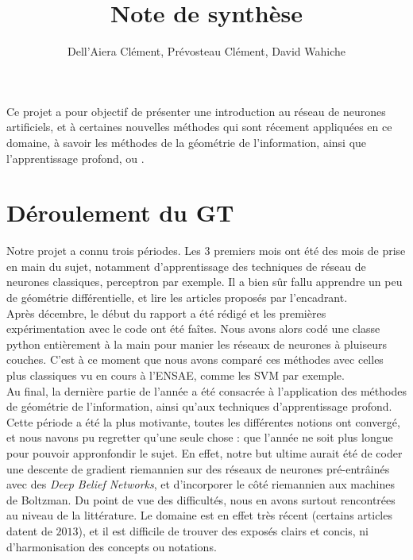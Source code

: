 \documentclass{article}
\title{Note de synthèse}
\author{Dell'Aiera Clément, Prévosteau Clément, David Wahiche}
\date{}
\begin{document}
\maketitle


Ce projet a pour objectif de présenter une introduction au réseau de neurones artificiels, et à certaines nouvelles méthodes qui sont récement appliquées en ce domaine, à savoir les méthodes de la géométrie de l'information, ainsi que l'apprentissage profond, ou .\\

\section{Déroulement du GT}

Notre projet a connu trois périodes. Les 3 premiers mois ont été des mois de prise en main du sujet, notamment d'apprentissage des techniques de réseau de neurones classiques, perceptron par exemple. Il a bien sûr fallu apprendre un peu de géométrie différentielle, et lire les articles proposés par l'encadrant. \\

Après décembre, le début du rapport a été rédigé et les premières expérimentation avec le code ont été faîtes. Nous avons alors codé une classe python entièrement à la main pour manier les réseaux de neurones à pluiseurs couches. C'est à ce moment que nous avons comparé ces méthodes avec celles plus classiques vu en cours à l'ENSAE, comme les SVM par exemple.\\

 Au final, la dernière partie de l'année a été consacrée à l'application des méthodes de géométrie de l'information, ainsi qu'aux techniques d'apprentissage profond. Cette période a été la plus motivante, toutes les différentes notions ont convergé, et nous navons pu regretter qu'une seule chose : que l'année ne soit plus longue pour pouvoir appronfondir le sujet. En effet, notre but ultime aurait été de coder une descente de gradient riemannien sur des réseaux de neurones pré-entrâinés avec des \textit{Deep Belief Networks}, et d'incorporer le côté riemannien aux machines de Boltzman. Du point de vue des difficultés, nous en avons surtout rencontrées au niveau de la littérature. Le domaine est en effet très récent (certains articles datent de $2013$), et il est difficile de trouver des exposés clairs et concis, ni d'harmonisation des concepts ou notations. \\
\end{document}
